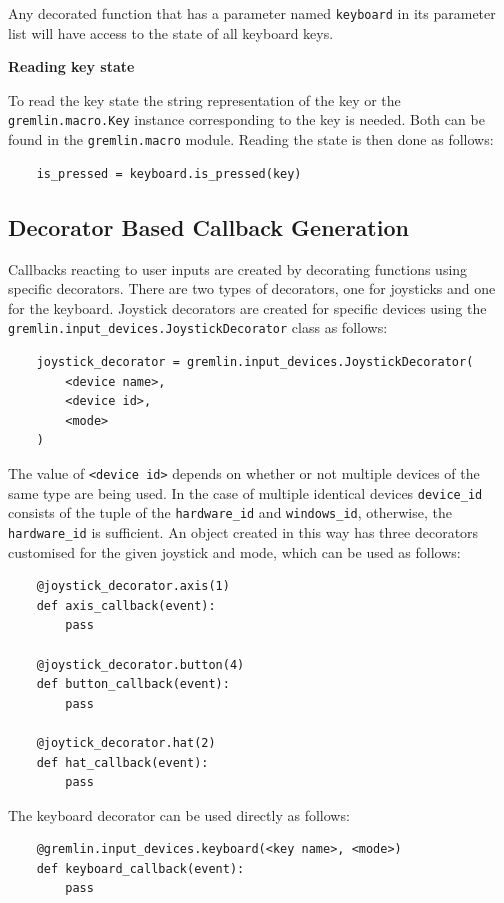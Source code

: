 \documentclass[a4, 10pt]{article}
\begin{document}
Any decorated function that has a parameter named \verb+keyboard+ in its
parameter list will have access to the state of all keyboard keys.

\vspace{1em}
\noindent\textbf{Reading key state}

\noindent To read the key state the string representation of the key or
the \texttt{gremlin.macro.\allowbreak Key} instance corresponding to the
key is needed. Both can be found in the \texttt{gremlin.macro} module.
Reading the state is then done as follows:
\begin{verbatim}
    is_pressed = keyboard.is_pressed(key)
\end{verbatim}


\subsection{Decorator Based Callback Generation}

Callbacks reacting to user inputs are created by decorating functions
using specific decorators. There are two types of decorators, one for
joysticks and one for the keyboard. Joystick decorators are created for
specific devices using the\\
\verb+gremlin.input_devices.JoystickDecorator+ class as follows:
\begin{verbatim}
    joystick_decorator = gremlin.input_devices.JoystickDecorator(
        <device name>,
        <device id>,
        <mode>
    )
\end{verbatim}

The value of \verb+<device id>+ depends on whether or not multiple
devices of the same type are being used. In the case of multiple
identical devices \verb+device_id+ consists of the tuple of the
\verb+hardware_id+ and \verb+windows_id+, otherwise, the
\verb+hardware_id+ is sufficient. An object created in this way has
three decorators customised for the given joystick and mode, which can be
used as follows:
\begin{verbatim}
    @joystick_decorator.axis(1)
    def axis_callback(event):
        pass

    @joystick_decorator.button(4)
    def button_callback(event):
        pass

    @joytick_decorator.hat(2)
    def hat_callback(event):
        pass
\end{verbatim}

The keyboard decorator can be used directly as follows:
\begin{verbatim}
    @gremlin.input_devices.keyboard(<key name>, <mode>)
    def keyboard_callback(event):
        pass
\end{verbatim}
\end{document}
